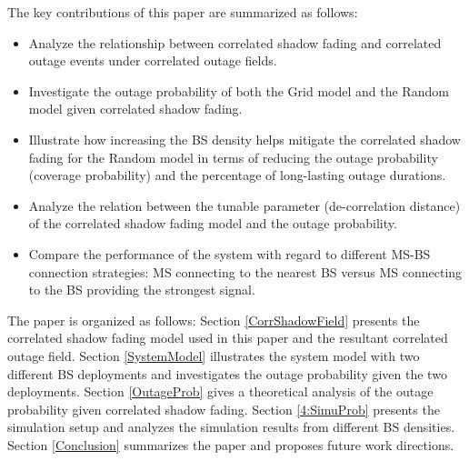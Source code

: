 \documentclass[journal,10pt]{IEEEtran}
\begin{document}
 \par The key contributions of this paper are summarized as follows:
 \begin{itemize}
 \item Analyze the relationship between correlated shadow fading and correlated outage events under correlated outage fields.
 \item Investigate the outage probability of both the Grid model and the Random model given correlated shadow fading.
 \item Illustrate how increasing the BS density helps mitigate the correlated shadow fading for the Random model in terms of reducing the outage probability (coverage probability) and the percentage of long-lasting outage durations.
 \item Analyze the relation between the tunable parameter (de-correlation distance) of the correlated shadow fading model and the outage probability.
 \item Compare the performance of the system with regard to different MS-BS connection strategies: MS connecting to the nearest BS versus MS connecting to the BS providing the strongest signal.
 \end{itemize}
 The paper is organized as follows: Section \ref{CorrShadowField} presents the correlated shadow fading model used in this paper and the resultant correlated outage field. Section \ref{SystemModel} illustrates the system model with two different BS deployments and investigates the outage probability given the two deployments. Section \ref{OutageProb} gives a theoretical analysis of the outage probability given correlated shadow fading. Section \ref{4:SimuProb} presents the simulation setup and analyzes the simulation results from different BS densities. Section \ref{Conclusion} summarizes the paper and proposes future work directions.
\end{document}
